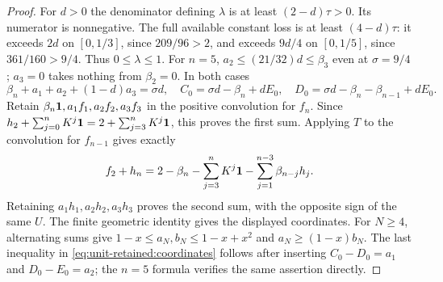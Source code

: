 \begin{proof}
For $d>0$ the denominator defining $\lambda$ is at least
$(2-d)\tau>0$. Its numerator is nonnegative. The full available
constant loss is at least $(4-d)\tau$: it exceeds $2d$ on
$[0,1/3]$, since $209/96>2$, and exceeds $9d/4$ on $[0,1/5]$,
since $361/160>9/4$. Thus $0\le\lambda\le1$.
For $n=5$, $a_2\le(21/32)d\le\beta_3$ even at $\sigma=9/4$;
$a_3=0$ takes nothing from $\beta_2=0$.
In both cases
\[
 \beta_n+a_1+a_2+(1-d)a_3=\sigma d,
 \quad C_0=\sigma d-\beta_n+dE_0,
 \quad D_0=\sigma d-\beta_n-\beta_{n-1}+dE_0.
\]
Retain $\beta_n\mathbf1,a_1f_1,a_2f_2,a_3f_3$ in the positive
convolution for $f_n$. Since $h_2+\sum_{j=0}^nK^j\mathbf1
=2+\sum_{j=3}^nK^j\mathbf1$, this proves the first sum.
Applying $T$ to the convolution for $f_{n-1}$ gives exactly
\[
 f_2+h_n=2-\beta_n-\sum_{j=3}^nK^j\mathbf1
             -\sum_{j=1}^{n-3}\beta_{n-j}h_j.
\]
Retaining $a_1h_1,a_2h_2,a_3h_3$ proves the second sum, with
the opposite sign of the same $U$.
The finite geometric identity gives the displayed coordinates.
For $N\ge4$, alternating sums give
$1-x\le a_N,b_N\le1-x+x^2$ and $a_N\ge(1-x)b_N$.
The last inequality in \eqref{eq:unit-retained:coordinates} follows
after inserting $C_0-D_0=a_1$ and $D_0-E_0=a_2$;
the $n=5$ formula verifies the same assertion directly.
\end{proof}

